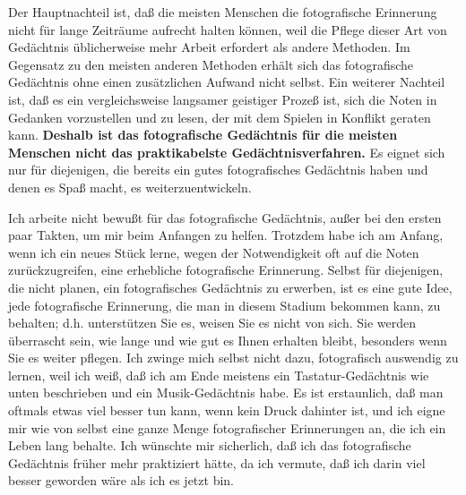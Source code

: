 Der Hauptnachteil ist, daß die meisten Menschen die fotografische Erinnerung nicht für lange Zeiträume aufrecht halten können, weil die Pflege dieser Art von Gedächtnis üblicherweise mehr Arbeit erfordert als andere Methoden.
Im Gegensatz zu den meisten anderen Methoden erhält sich das fotografische Gedächtnis ohne einen zusätzlichen Aufwand nicht selbst.
Ein weiterer Nachteil ist, daß es ein vergleichsweise langsamer geistiger Prozeß ist, sich die Noten in Gedanken vorzustellen und zu lesen, der mit dem Spielen in Konflikt geraten kann.
\textbf{Deshalb ist das fotografische Gedächtnis für die meisten Menschen nicht das praktikabelste Gedächtnisverfahren.}
Es eignet sich nur für diejenigen, die bereits ein gutes fotografisches Gedächtnis haben und denen es Spaß macht, es weiterzuentwickeln.

Ich arbeite nicht bewußt für das fotografische Gedächtnis, außer bei den ersten paar Takten, um mir beim Anfangen zu helfen.
Trotzdem habe ich am Anfang, wenn ich ein neues Stück lerne, wegen der Notwendigkeit oft auf die Noten zurückzugreifen, eine erhebliche fotografische Erinnerung.
Selbst für diejenigen, die nicht planen, ein fotografisches Gedächtnis zu erwerben, ist es eine gute Idee, jede fotografische Erinnerung, die man in diesem Stadium bekommen kann, zu behalten; d.h. unterstützen Sie es, weisen Sie es nicht von sich.
Sie werden überrascht sein, wie lange und wie gut es Ihnen erhalten bleibt, besonders wenn Sie es weiter pflegen.
Ich zwinge mich selbst nicht dazu, fotografisch auswendig zu lernen, weil ich weiß, daß ich am Ende meistens ein Tastatur-Gedächtnis wie unten beschrieben und ein Musik-Gedächtnis habe.
Es ist erstaunlich, daß man oftmals etwas viel besser tun kann, wenn kein Druck dahinter ist, und ich eigne mir wie von selbst eine ganze Menge fotografischer Erinnerungen an, die ich ein Leben lang behalte.
Ich wünschte mir sicherlich, daß ich das fotografische Gedächtnis früher mehr praktiziert hätte, da ich vermute, daß ich darin viel besser geworden wäre als ich es jetzt bin.

